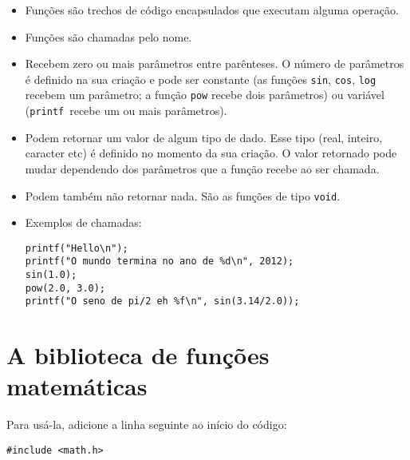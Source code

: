 \documentclass{book}
\newcommand{\PRINTF}{{\tt printf}}
\begin{document}
\begin{itemize}

\item Funções são trechos de código encapsulados que executam alguma operação.
\item Funções são chamadas pelo nome.
\item Recebem zero ou mais parâmetros entre parênteses. O número de parâmetros é definido na sua criação e pode ser constante 
(as funções {\tt sin}, {\tt cos}, {\tt log} recebem um parâmetro; 
a função {\tt pow} recebe dois parâmetros)
ou variável (\PRINTF\ recebe um ou mais parâmetros).
\item Podem retornar um valor de algum tipo de dado. Esse tipo (real, inteiro, caracter etc) é definido no momento da sua criação. O valor retornado pode mudar dependendo dos parâmetros que a função recebe ao ser chamada.
\item Podem também não retornar nada. São as funções de tipo {\tt void}.

\item Exemplos de chamadas:

\begin{lstlisting}
printf("Hello\n");
printf("O mundo termina no ano de %d\n", 2012);
sin(1.0);
pow(2.0, 3.0);
printf("O seno de pi/2 eh %f\n", sin(3.14/2.0));
\end{lstlisting}

\end{itemize}


\section{A biblioteca de funções matemáticas}

Para usá-la, adicione a linha seguinte ao início do código:

\begin{lstlisting}
#include <math.h>
\end{lstlisting}
\end{document}
